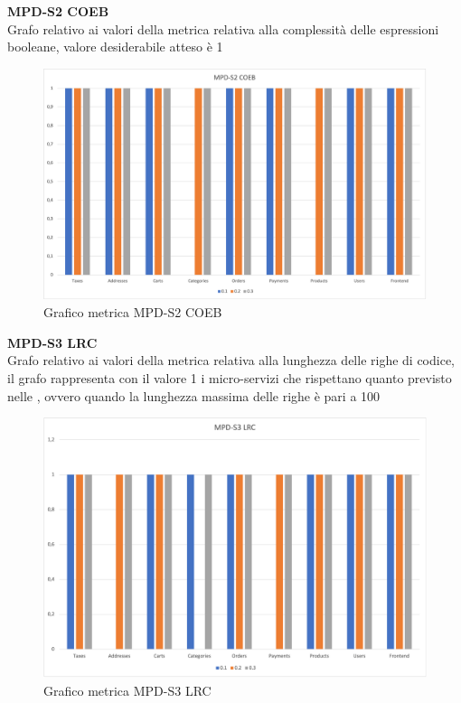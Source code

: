 \begin{center}
    \textbf{MPD-S2 COEB} \\
    Grafo relativo ai valori della metrica relativa alla complessità delle espressioni booleane, valore desiderabile atteso è 1
    \begin{figure}[!htb]
        \centering
        \includegraphics[scale=0.50]{res/images/RQcoeb.png}
        \caption{Grafico metrica MPD-S2 COEB}
    \end{figure}
    \begin{center}
    \end{center}
\end{center}




\begin{center}
    \textbf{MPD-S3 LRC} \\
    Grafo relativo ai valori della metrica relativa alla lunghezza delle righe di codice, il grafo rappresenta con il valore 1 i micro-servizi
    che rispettano quanto previsto nelle , ovvero quando la lunghezza massima delle righe è pari a 100     \begin{figure}[!htb]
        \centering
        \includegraphics[scale=0.50]{res/images/RQlrc.png}
        \caption{Grafico metrica MPD-S3 LRC}
    \end{figure}
    \begin{center}
    \end{center}
\end{center}


